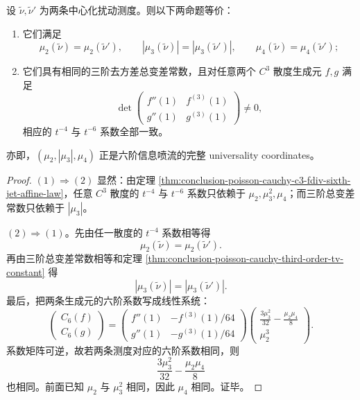 \begin{theorem}\label{thm:conclusion-poisson-cauchy-sixth-universality-class}
设 \(\tilde\nu,\tilde\nu'\) 为两条中心化扰动测度。则以下两命题等价：
\begin{enumerate}
\item 它们满足
\[
\mu_2(\tilde\nu)=\mu_2(\tilde\nu'),\qquad
|\mu_3(\tilde\nu)|=|\mu_3(\tilde\nu')|,\qquad
\mu_4(\tilde\nu)=\mu_4(\tilde\nu');
\]
\item 它们具有相同的三阶去方差总变差常数，且对任意两个 \(C^3\) 散度生成元 \(f,g\) 满足
\[
\det
\begin{pmatrix}
f''(1) & f^{(3)}(1)\\
g''(1) & g^{(3)}(1)
\end{pmatrix}\neq0,
\]
相应的 \(t^{-4}\) 与 \(t^{-6}\) 系数全部一致。
\end{enumerate}
亦即，\((\mu_2,|\mu_3|,\mu_4)\) 正是六阶信息喷流的完整 universality coordinates。
\end{theorem}
\begin{proof}
\((1)\Rightarrow(2)\) 显然：由定理 \ref{thm:conclusion-poisson-cauchy-c3-fdiv-sixth-jet-affine-law}，任意 \(C^3\) 散度的 \(t^{-4}\) 与 \(t^{-6}\) 系数只依赖于 \(\mu_2,\mu_3^2,\mu_4\)；而三阶总变差常数只依赖于 \(|\mu_3|\)。

\((2)\Rightarrow(1)\)。先由任一散度的 \(t^{-4}\) 系数相等得
\[
\mu_2(\tilde\nu)=\mu_2(\tilde\nu').
\]
再由三阶总变差常数相等和定理 \ref{thm:conclusion-poisson-cauchy-third-order-tv-constant} 得
\[
|\mu_3(\tilde\nu)|=|\mu_3(\tilde\nu')|.
\]
最后，把两条生成元的六阶系数写成线性系统：
\[
\begin{pmatrix}
C_6(f)\\[1mm]
C_6(g)
\end{pmatrix}
=
\begin{pmatrix}
f''(1) & -f^{(3)}(1)/64\\
g''(1) & -g^{(3)}(1)/64
\end{pmatrix}
\begin{pmatrix}
\frac{3\mu_3^2}{32}-\frac{\mu_2\mu_4}{8}\\[1mm]
\mu_2^3
\end{pmatrix}.
\]
系数矩阵可逆，故若两条测度对应的六阶系数相同，则
\[
\frac{3\mu_3^2}{32}-\frac{\mu_2\mu_4}{8}
\]
也相同。前面已知 \(\mu_2\) 与 \(\mu_3^2\) 相同，因此 \(\mu_4\) 相同。证毕。
\end{proof}

